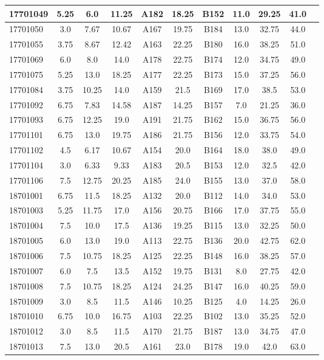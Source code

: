\documentclass[12pt]{article}
\begin{document}
\begin{center}
\begin{small}
\begin{tabular}{|l|c|c|c|c|c|c|c|c|c|c|}
17701049 & 5.25 & 6.0 & 11.25 & A182 & 18.25 & B152 & 11.0 & 29.25 & 41.0\\ \hline 
17701050 & 3.0 & 7.67 & 10.67 & A167 & 19.75 & B184 & 13.0 & 32.75 & 44.0\\ \hline 
17701055 & 3.75 & 8.67 & 12.42 & A163 & 22.25 & B180 & 16.0 & 38.25 & 51.0\\ \hline 
17701069 & 6.0 & 8.0 & 14.0 & A178 & 22.75 & B174 & 12.0 & 34.75 & 49.0\\ \hline 
17701075 & 5.25 & 13.0 & 18.25 & A177 & 22.25 & B173 & 15.0 & 37.25 & 56.0\\ \hline 
17701084 & 3.75 & 10.25 & 14.0 & A159 & 21.5 & B169 & 17.0 & 38.5 & 53.0\\ \hline 
17701092 & 6.75 & 7.83 & 14.58 & A187 & 14.25 & B157 & 7.0 & 21.25 & 36.0\\ \hline 
17701093 & 6.75 & 12.25 & 19.0 & A191 & 21.75 & B162 & 15.0 & 36.75 & 56.0\\ \hline 
17701101 & 6.75 & 13.0 & 19.75 & A186 & 21.75 & B156 & 12.0 & 33.75 & 54.0\\ \hline 
17701102 & 4.5 & 6.17 & 10.67 & A154 & 20.0 & B164 & 18.0 & 38.0 & 49.0\\ \hline 
17701104 & 3.0 & 6.33 & 9.33 & A183 & 20.5 & B153 & 12.0 & 32.5 & 42.0\\ \hline 
17701106 & 7.5 & 12.75 & 20.25 & A185 & 24.0 & B155 & 13.0 & 37.0 & 58.0\\ \hline 
18701001 & 6.75 & 11.5 & 18.25 & A132 & 20.0 & B112 & 14.0 & 34.0 & 53.0\\ \hline 
18701003 & 5.25 & 11.75 & 17.0 & A156 & 20.75 & B166 & 17.0 & 37.75 & 55.0\\ \hline 
18701004 & 7.5 & 10.0 & 17.5 & A136 & 19.25 & B115 & 13.0 & 32.25 & 50.0\\ \hline 
18701005 & 6.0 & 13.0 & 19.0 & A113 & 22.75 & B136 & 20.0 & 42.75 & 62.0\\ \hline 
18701006 & 7.5 & 10.75 & 18.25 & A125 & 22.25 & B148 & 16.0 & 38.25 & 57.0\\ \hline 
18701007 & 6.0 & 7.5 & 13.5 & A152 & 19.75 & B131 & 8.0 & 27.75 & 42.0\\ \hline 
18701008 & 7.5 & 10.75 & 18.25 & A124 & 24.25 & B147 & 16.0 & 40.25 & 59.0\\ \hline 
18701009 & 3.0 & 8.5 & 11.5 & A146 & 10.25 & B125 & 4.0 & 14.25 & 26.0\\ \hline 
18701010 & 6.75 & 10.0 & 16.75 & A103 & 22.25 & B102 & 13.0 & 35.25 & 52.0\\ \hline 
18701012 & 3.0 & 8.5 & 11.5 & A170 & 21.75 & B187 & 13.0 & 34.75 & 47.0\\ \hline 
18701013 & 7.5 & 13.0 & 20.5 & A161 & 23.0 & B178 & 19.0 & 42.0 & 63.0\\ \hline 
        \end{tabular}
            \end{small}
            \end{center}
  \centering
            
\end{document}
